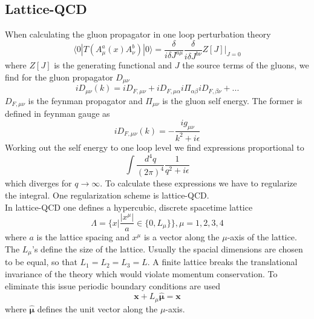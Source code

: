 \subsection{Lattice-QCD}
	When calculating the gluon propagator in one loop perturbation theory \cite{qcd2_script_philipsen}
	\begin{equation}
	    \langle 0|T(A^a_\mu(x)A^b_\nu)|0\rangle = \frac{\delta}{i\delta J^{a\mu}} \frac{\delta}{i\delta J^{b\nu}} Z[J]\Big|_{J=0}
	\end{equation}
	where $Z[J]$ is the generating functional and $J$ the source terms of the gluons, we find for the gluon propagator $D_{\mu\nu}$
	\begin{equation}
	    i D_{\mu\nu}(k) = i D_{F,\mu\nu} + i D_{F,\mu\alpha} i\Pi_{\alpha\beta} i D_{F,\beta\nu} + ...
	\end{equation}
	$D_{F,\mu\nu}$ is the feynman propagator and $\Pi_{\mu\nu}$ is the gluon self energy. The former is defined in feynman gauge as
	\begin{equation}
	    iD_{F,\mu\nu}(k) = -\frac{ig_{\mu\nu}}{k^2+i\epsilon}
	\end{equation}
	Working out the self energy to one loop level we find expressions proportional to
	\begin{equation}
	    \int\frac{d^4q}{(2\pi)^4}\frac{1}{q^2+i\epsilon}
	\end{equation}
	which diverges for $q\rightarrow\infty$. To calculate these expressions we have to regularize the integral. One regularization scheme is lattice-QCD.\\
	
	\noindent
	In lattice-QCD one defines a hypercubic, discrete spacetime lattice
	\begin{equation}
	    \Lambda = \{x|\frac{|x^\mu|}{a} \in \{0,L_\mu\}\}, \mu = 1,2,3,4
	\end{equation}
    where $a$ is the lattice spacing and $x^\mu$ is a vector along the $\mu$-axis of the lattice. The $L_\mu$'s define the size of the lattice. Usually the spacial dimensions are chosen to be equal, so that $L_1 = L_2 = L_3 = L$. A finite lattice breaks the translational invariance of the theory which would violate momentum conservation. To eliminate this issue periodic boundary conditions are used
    \begin{equation}
        \textbf{x} + L_\mu \hat{\boldsymbol{\mu}} = \textbf{x}
    \end{equation}
    where $\hat{\boldsymbol{\mu}}$ defines the unit vector along the $\mu$-axis.\\
    
